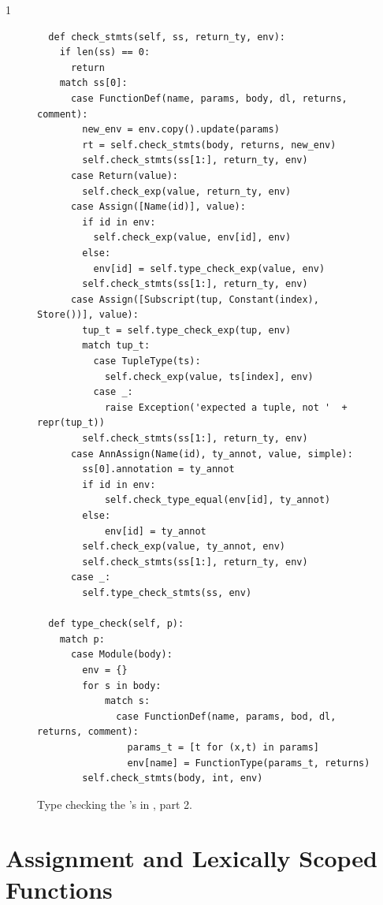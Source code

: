 \documentclass[7x10]{TimesAPriori_MIT}%
\def\pythonEd{1}
\def\edition{1}
\newcommand{\pythonColor}[0]{}
\numberwithin{theorem}{chapter}
\numberwithin{definition}{chapter}
\numberwithin{equation}{chapter}
\begin{document}
{\if\edition\pythonEd\pythonColor 
\begin{figure}[tbp]
  \begin{tcolorbox}[colback=white]
    \begin{lstlisting}
  def check_stmts(self, ss, return_ty, env):
    if len(ss) == 0:
      return
    match ss[0]:
      case FunctionDef(name, params, body, dl, returns, comment):
        new_env = env.copy().update(params)
        rt = self.check_stmts(body, returns, new_env)
        self.check_stmts(ss[1:], return_ty, env)
      case Return(value):
        self.check_exp(value, return_ty, env)
      case Assign([Name(id)], value):
        if id in env:
          self.check_exp(value, env[id], env)
        else:
          env[id] = self.type_check_exp(value, env)
        self.check_stmts(ss[1:], return_ty, env)
      case Assign([Subscript(tup, Constant(index), Store())], value):
        tup_t = self.type_check_exp(tup, env)
        match tup_t:
          case TupleType(ts):
            self.check_exp(value, ts[index], env)
          case _:
            raise Exception('expected a tuple, not '  + repr(tup_t))
        self.check_stmts(ss[1:], return_ty, env)
      case AnnAssign(Name(id), ty_annot, value, simple):
        ss[0].annotation = ty_annot
        if id in env:
            self.check_type_equal(env[id], ty_annot)
        else:
            env[id] = ty_annot
        self.check_exp(value, ty_annot, env)
        self.check_stmts(ss[1:], return_ty, env)
      case _:
        self.type_check_stmts(ss, env)

  def type_check(self, p):
    match p:
      case Module(body):
        env = {}
        for s in body:
            match s:
              case FunctionDef(name, params, bod, dl, returns, comment):
                params_t = [t for (x,t) in params]
                env[name] = FunctionType(params_t, returns)
        self.check_stmts(body, int, env)
\end{lstlisting}
  \end{tcolorbox}

  \caption{Type checking the 's in \LangLam{}, part 2.}
\label{fig:type-check-Llambda-part2}
\end{figure}
\fi}

\clearpage

\section{Assignment and Lexically Scoped Functions}
\label{sec:assignment-scoping}
\end{document}
